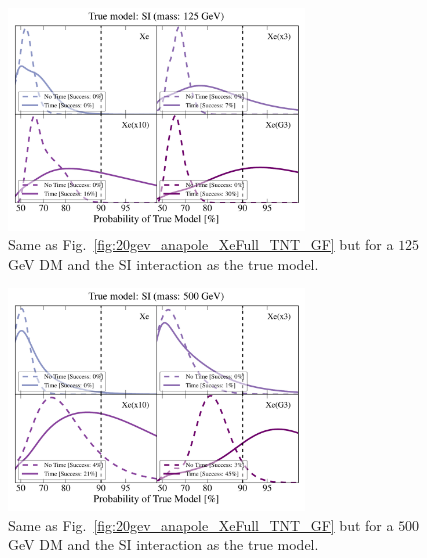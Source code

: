 \documentclass[11pt, a4paper]{article}
\begin{document}
\begin{figure}
\centering
\includegraphics[width=0.7\textwidth]{plots/PDF_125GeV_SI_Higgs_50sims_Xe_Xe3x_Xe10x_XeG3_GF_TNT.pdf}
\caption{\label{fig:125gev_SI_Higgs_XeFull_TNT_GF}
Same as Fig.~\ref{fig:20gev_anapole_XeFull_TNT_GF} but for a $125$ GeV DM and the SI interaction as the true model.}
\end{figure}


\begin{figure}
\centering
\includegraphics[width=0.7\textwidth]{plots/PDF_500GeV_SI_Higgs_50sims_Xe_Xe3x_Xe10x_XeG3_GF_TNT.pdf}
\caption{\label{fig:500gev_SI_Higgs_XeFull_TNT_GF}
Same as Fig.~\ref{fig:20gev_anapole_XeFull_TNT_GF} but for a $500$ GeV DM and the SI interaction as the true model.}
\end{figure}



\end{document}

